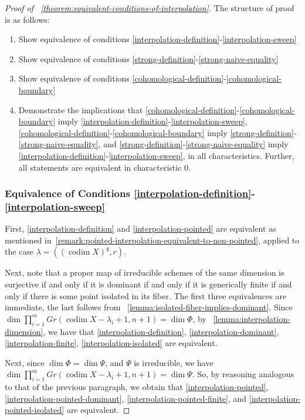 \documentclass[reqno, 11pt]{amsart}
\theoremstyle{definition}
\theoremstyle{remark}
\numberwithin{equation}{section}
\numberwithin{thm}{section}
\numberwithin{prop}{section}
\numberwithin{lem}{section}
\numberwithin{cor}{section}
\numberwithin{conj}{section}
\numberwithin{defn}{section}
\theoremstyle{plain}
\theoremstyle{definition}
\newcommand\sssec{\subsubsection}
\DeclareMathOperator\codim{codim}
\begin{document}
\begin{proof}[Proof of ~\autoref{theorem:equivalent-conditions-of-interpolation}]

The structure of proof is as follows:
\begin{enumerate}
	\item Show equivalence of conditions \ref{interpolation-definition}-\ref{interpolation-sweep}
	\item Show equivalence of conditions \ref{strong-definition}-\ref{strong-naive-equality}
	\item Show equivalence of conditions \ref{cohomological-definition}-\ref{cohomological-boundary}
	\item Demonstrate the implications that \ref{cohomological-definition}-\ref{cohomological-boundary} imply \ref{interpolation-definition}-\ref{interpolation-sweep},  \ref{cohomological-definition}-\ref{cohomological-boundary} imply
\ref{strong-definition}-\ref{strong-naive-equality}, and
\ref{strong-definition}-\ref{strong-naive-equality}
imply
\ref{interpolation-definition}-\ref{interpolation-sweep}, in all characteristics. Further, all statements are equivalent in characteristic $0$.
\end{enumerate}
\sssec{Equivalence of Conditions \ref{interpolation-definition}-\ref{interpolation-sweep}}

First, \ref{interpolation-definition} and
\ref{interpolation-pointed} are equivalent as mentioned in~\autoref{remark:pointed-interpolation-equivalent-to-non-pointed},
applied to the case $\lambda = ((\codim X)^q, r)$.

Next, note that a proper map of irreducible schemes of the same dimension is
surjective if and only if it is dominant if and only if it is generically
finite if and only if there is some point isolated in its fiber.
The first three equivalences are immediate, the last follows from
~\autoref{lemma:isolated-fiber-implies-dominant}.
Since $\dim \prod_{i=1}^m Gr(\codim X - \lambda_i +1, n+1) = \dim \Phi$,
by ~\autoref{lemma:interpolation-dimension},
we have that \ref{interpolation-definition}, \ref{interpolation-dominant},
\ref{interpolation-finite}, \ref{interpolation-isolated} are equivalent.

Next, since $\dim \Phi = \dim \Psi$, and $\Psi$ is irreducible, 
we have
$\dim \prod_{i=1}^m Gr(\codim X - \lambda_i +1, n+1) = \dim \Psi$.
So, by reasoning analogous to that of the previous paragraph, we obtain that \ref{interpolation-pointed}, \ref{interpolation-pointed-dominant}, \ref{interpolation-pointed-finite}, and \ref{interpolation-pointed-isolated} are equivalent.


\end{proof}
\end{document}
